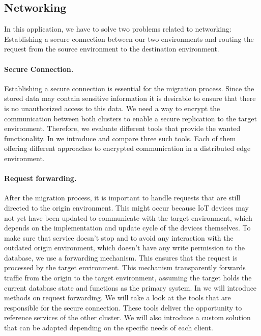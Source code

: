 %
\subsection{Networking}
\label{sec:networking}
%
In this application, we have to solve two problems related to networking: Establishing a secure connection between our two environments and routing the request from the source environment to the destination environment.
%
\paragraph{Secure Connection.}
%
Establishing a secure connection is essential for the migration process. Since the stored data may contain sensitive information it is desirable to ensure that there is no unauthorized access to this data. We need a way to encrypt the communication between both clusters to enable a secure replication to the target environment. Therefore, we evaluate different tools that provide the wanted functionality. In  we introduce and compare three such tools. Each of them offering different approaches to encrypted communication in a distributed edge environment.
%
\paragraph{Request forwarding.}
%
After the migration process, it is important to handle requests that are still directed to the origin environment. This might occur because IoT devices may not yet have been updated to communicate with the target environment, which depends on the implementation and update cycle of the devices themselves. To make sure that service doesn't stop and to avoid any interaction with the outdated origin environment, which doesn't have any write permission to the database, we use a forwarding mechanism. This ensures that the request is processed by the target environment. This mechanism transparently forwards traffic from the origin to the target environment, assuming the target holds the current database state and functions as the primary system. In  we will introduce methods on request forwarding. We will take a look at the tools that are responsible for the secure connection. These tools deliver the opportunity to reference services of the other cluster. We will also introduce a custom solution that can be adapted depending on the specific needs of each client.